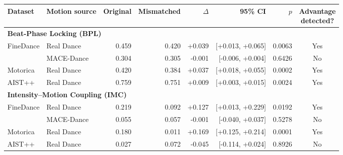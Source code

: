\begin{tabular}{llrrrrrc}
\toprule
Dataset & Motion source & Original & Mismatched & $\Delta$ & 95\% CI & $p$ & \shortstack{Advantage\\detected?} \\
\midrule
\multicolumn{8}{l}{\textbf{Beat-Phase Locking (BPL)}} \\
\midrule
FineDance & Real Dance & 0.459 & 0.420 & +0.039 & [+0.013, +0.065] & 0.0063 & Yes \\
 & MACE-Dance & 0.304 & 0.305 & -0.001 & [-0.006, +0.004] & 0.6426 & No \\
Motorica & Real Dance & 0.420 & 0.384 & +0.037 & [+0.018, +0.055] & 0.0002 & Yes \\
AIST++ & Real Dance & 0.759 & 0.751 & +0.009 & [+0.003, +0.015] & 0.0024 & Yes \\
\midrule
\multicolumn{8}{l}{\textbf{Intensity--Motion Coupling (IMC)}} \\
\midrule
FineDance & Real Dance & 0.219 & 0.092 & +0.127 & [+0.013, +0.229] & 0.0192 & Yes \\
 & MACE-Dance & 0.055 & 0.057 & -0.001 & [-0.040, +0.037] & 0.5278 & No \\
Motorica & Real Dance & 0.180 & 0.011 & +0.169 & [+0.125, +0.214] & 0.0001 & Yes \\
AIST++ & Real Dance & 0.027 & 0.072 & -0.045 & [-0.114, +0.024] & 0.8926 & No \\
\bottomrule
\end{tabular}
